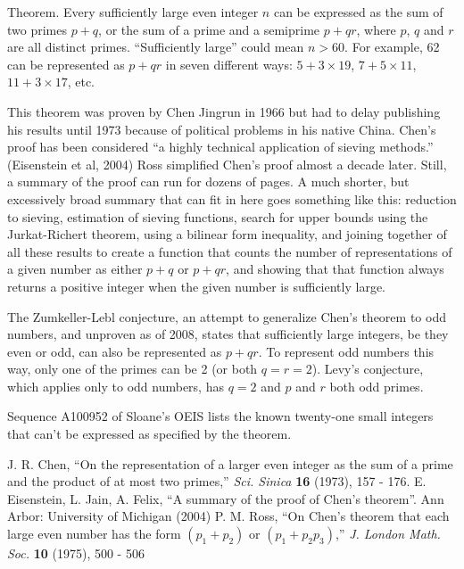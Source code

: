 \documentclass[12pt]{article}
\begin{document}
Theorem. Every sufficiently large even integer $n$ can be expressed as the sum of two primes $p + q$, or the sum of a prime and a semiprime $p + qr$, where $p$, $q$ and $r$ are all distinct primes. ``Sufficiently large'' could mean $n > 60$. For example, 62 can be represented as $p + qr$ in seven different ways: $5 + 3 \times 19$, $7 + 5 \times 11$, $11 + 3 \times 17$, etc.

This theorem was proven by Chen Jingrun in 1966 but had to delay publishing his results until 1973 because of political problems in his native China. Chen's proof has been considered ``a highly technical application of sieving methods.'' (Eisenstein et al, 2004) Ross simplified Chen's proof almost a decade later. Still, a summary of the proof can run for dozens of pages. A much shorter, but excessively broad summary that can fit in here goes something like this: reduction to sieving, estimation of sieving functions, search for upper bounds using the Jurkat-Richert theorem, using a bilinear form inequality, and joining together of all these results to create a function that counts the number of representations of a given number as either $p + q$ or $p + qr$, and showing that that function always returns a positive integer when the given number is sufficiently large.

The Zumkeller-Lebl conjecture, an attempt to generalize Chen's theorem to odd numbers, and unproven as of 2008, states that sufficiently large integers, be they even or odd, can also be represented as $p + qr$. To represent odd numbers this way, only one of the primes can be 2 (or both $q = r = 2$). Levy's conjecture, which applies only to odd numbers, has $q = 2$ and $p$ and $r$ both odd primes.

Sequence A100952 of Sloane's OEIS lists the known twenty-one small integers that can't be expressed as specified by the theorem.

\begin{thebibliography}{9}
 J. R. Chen, ``On the representation of a larger even integer as the sum of a prime and the product of at most two primes,'' {\it Sci. Sinica} {\bf 16} (1973), 157 - 176. 
 E. Eisenstein, L. Jain, A. Felix, ``A summary of the proof of Chen's theorem''. Ann Arbor: University of Michigan (2004)
 P. M. Ross, ``On Chen's theorem that each large even number has the form $(p_1 + p_2)$ or $(p_1 + p_2p_3)$,'' {\it J. London Math. Soc.} {\bf 10} (1975), 500 - 506
\end{thebibliography}
\end{document}

